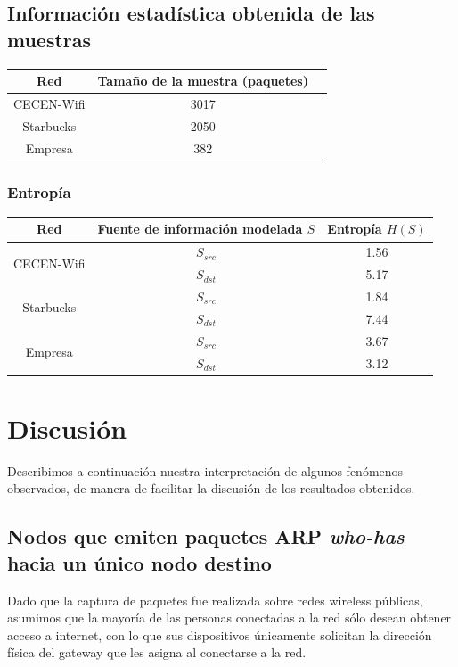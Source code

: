 \documentclass[10pt, a4paper]{article}
\begin{document}
\subsection{Información estadística obtenida de las muestras}

\begin{center}
\begin{tabular}{|c|c|c|}
\hline
Red & Tamaño de la muestra (paquetes)\\
\hline
CECEN-Wifi & 3017 \\
Starbucks   & 2050 \\
Empresa    &  382 \\
\hline
\end{tabular}
\end{center}


\subsubsection{Entropía}

\begin{center}
\begin{tabular}{|c|c|c|}
\hline
Red & Fuente de información modelada $S$ & Entropía $H(S)$\\
\hline
\multirow{2}{*}{CECEN-Wifi}  & $S_{src}$ & 1.56 \\
						     & $S_{dst}$ & 5.17 \\
\hline
\multirow{2}{*}{Starbucks}   & $S_{src}$ & 1.84 \\
						     & $S_{dst}$ & 7.44 \\
\hline
\multirow{2}{*}{Empresa}     & $S_{src}$ & 3.67 \\
						    & $S_{dst}$ & 3.12 \\
\hline
\end{tabular}
\end{center}

\section{Discusión}
Describimos a continuación nuestra interpretación de algunos fenómenos observados, de manera de facilitar la discusión de los resultados obtenidos.

\subsection{Nodos que emiten paquetes ARP \textit{who-has} hacia un único nodo destino}

Dado que la captura de paquetes fue realizada sobre redes wireless públicas, asumimos que la mayoría de las personas conectadas a la red sólo desean obtener acceso a internet, con lo que sus dispositivos únicamente solicitan la dirección física del gateway que les asigna al conectarse a la red.
\end{document}
